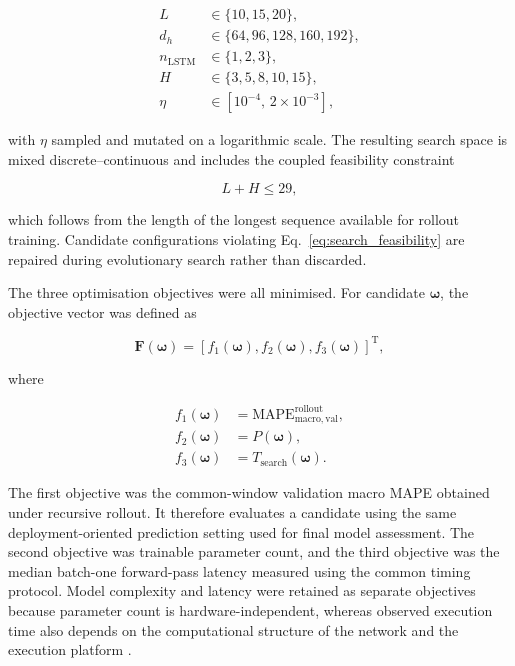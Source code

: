 \documentclass[a4paper,fleqn]{cas-sc}
\begin{document}
\begin{align}
L &\in \{10,15,20\}, \\
d_h &\in \{64,96,128,160,192\}, \\
n_{\mathrm{LSTM}} &\in \{1,2,3\}, \\
H &\in \{3,5,8,10,15\}, \\
\eta &\in [10^{-4},\,2\times10^{-3}],
\label{eq:search_domains}
\end{align}

with $\eta$ sampled and mutated on a logarithmic scale. The resulting search space is mixed discrete--continuous and includes the coupled feasibility constraint

\begin{equation}
L+H\leq29,
\label{eq:search_feasibility}
\end{equation}

which follows from the length of the longest sequence available for rollout training. Candidate configurations violating Eq.~\eqref{eq:search_feasibility} are repaired during evolutionary search rather than discarded.

The three optimisation objectives were all minimised. For candidate $\boldsymbol{\omega}$, the objective vector was defined as

\begin{equation}
\mathbf{F}(\boldsymbol{\omega})
=
\left[
f_{1}(\boldsymbol{\omega}),
f_{2}(\boldsymbol{\omega}),
f_{3}(\boldsymbol{\omega})
\right]^{\mathrm{T}},
\label{eq:objective_vector}
\end{equation}

where

\begin{align}
f_{1}(\boldsymbol{\omega})
&=
\mathrm{MAPE}_{\mathrm{macro,val}}^{\mathrm{rollout}},
\label{eq:objective_mape}
\\
f_{2}(\boldsymbol{\omega})
&=
P(\boldsymbol{\omega}),
\label{eq:objective_parameters}
\\
f_{3}(\boldsymbol{\omega})
&=
T_{\mathrm{search}}(\boldsymbol{\omega}).
\label{eq:objective_latency}
\end{align}

The first objective was the common-window validation macro MAPE obtained under recursive rollout. It therefore evaluates a candidate using the same deployment-oriented prediction setting used for final model assessment. The second objective was trainable parameter count, and the third objective was the median batch-one forward-pass latency measured using the common timing protocol. Model complexity and latency were retained as separate objectives because parameter count is hardware-independent, whereas observed execution time also depends on the computational structure of the network and the execution platform \cite{tan2019mnasnet,phan2024monas}.
\end{document}
